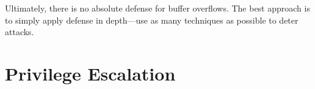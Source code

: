 \documentclass[code]{amznotes}
\begin{document}







Ultimately, there is no absolute defense for buffer overflows. The best approach is to simply apply defense in depth---use as many techniques as possible to deter attacks.

\section{Privilege Escalation}
\end{document}

